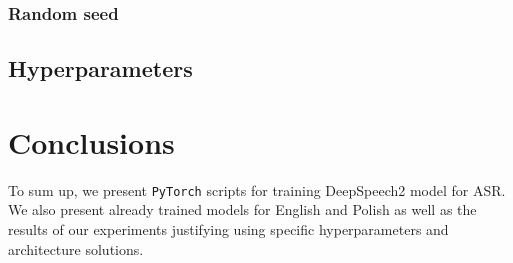 \documentclass[licencjacka,en]{pracamgr}
\begin{document}
\subsection{Random seed}

\section{Hyperparameters}





\chapter{Conclusions}\label{r:concls}

To sum up, we present \texttt{PyTorch} scripts for training DeepSpeech2 model for ASR. We also present already trained models for English and Polish as well as the results of our experiments justifying using specific hyperparameters and architecture solutions.\\
\end{document}
